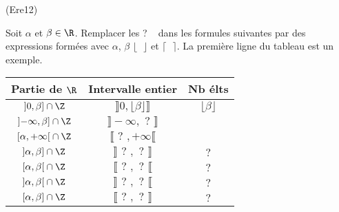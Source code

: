 \begin{tiny}(Ere12)\end{tiny} Soit $\alpha$ et $\beta \in \R$. Remplacer les \og ? \fg~ dans les formules suivantes par des expressions formées avec $\alpha$, $\beta$ $\lfloor \phantom{\alpha}\rfloor$ et $\lceil \phantom{\alpha}\rceil$. La première ligne du tableau est un exemple.
\begin{center}
\renewcommand{\arraystretch}{1.5}
\begin{tabular}{|c|c|c|} \hline
Partie de $\R$  & Intervalle entier & Nb élts\\ \hline
$\left] 0 , \beta \right] \cap \Z$  & $\rrbracket 0 , \lfloor \beta\rfloor \rrbracket$  & $\lfloor \beta \rfloor$\\ \hline
$\left] -\infty , \beta \right] \cap \Z$ & $\rrbracket -\infty, \text{ ? } \rrbracket$  & \\ \hline
$\left[ \alpha , +\infty \right[ \cap \Z$ & $\llbracket \text{ ? }, +\infty \llbracket$ & \\ \hline
$\left] \alpha , \beta \right] \cap \Z$ & $\rrbracket \text{ ? }, \text{ ? } \rrbracket$ & $\text{ ? }$\\ \hline
$\left[ \alpha , \beta \right[ \cap \Z$ & $\llbracket \text{ ? }, \text{ ? } \llbracket$ & $\text{ ? }$\\ \hline
$\left] \alpha , \beta \right[ \cap \Z$ & $\rrbracket \text{ ? }, \text{ ? } \llbracket$ & $\text{ ? } $\\ \hline
$\left[ \alpha , \beta \right] \cap \Z$ & $\llbracket \text{ ? }, \text{ ? } \rrbracket$ & $\text{ ? } $\\ \hline
\end{tabular}
\end{center}
